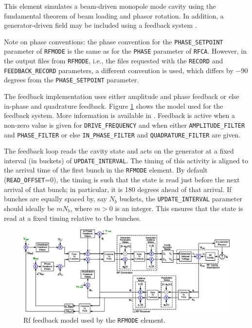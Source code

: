 This element simulates a beam-driven monopole mode cavity using the fundamental theorem of beam loading and phasor rotation.
In addition, a generator-driven field may be included using a feedback system \cite{Berenc-IPAC15-MOPMA006}.

Note on phase conventions: the phase convention for the \verb|PHASE_SETPOINT|  parameter of \verb|RFMODE| is the
same as for the \verb|PHASE| parameter of \verb|RFCA|. However, in the output files from \verb|RFMODE|, i.e., the
files requested with the \verb|RECORD| and \verb|FEEDBACK_RECORD| parameters, a different convention is used, which 
differs by $-90$ degrees from the \verb|PHASE_SETPOINT|  parameter. 

The feedback implementation uses either amplitude and phase feedback or else in-phase and quadrature feedback.
Figure \ref{fig:rfFeedbackModel} shows the model used for the feedback system.
More information is available in \cite{Berenc-IPAC15-MOPMA006}.
Feedback is active when a non-zero value is given for \verb|DRIVE_FREQUENCY| and when either
\verb|AMPLITUDE_FILTER| and \verb|PHASE_FILTER| or else
\verb|IN_PHASE_FILTER| and \verb|QUADRATURE_FILTER| are given.

The feedback loop reads the cavity state and acts on the generator at a fixed interval (in buckets) of
\verb|UPDATE_INTERVAL|. 
The timing of this activity is aligned to the arrival time of the first bunch in the \verb|RFMODE| element.
By default (\verb|READ_OFFSET|=0), the timing is such that the state is read just before the next arrival of
that bunch; in particular, it is 180 degrees ahead of that arrival.
If bunches are equally spaced by, say $N_b$ buckets, the \verb|UPDATE_INTERVAL| parameter should ideally be
$m N_b$, where $m>0$ is an integer.
This ensures that the state is read at a fixed timing relative to the bunches.

\begin{figure}[htb]
\center
\includegraphics{rfFeedbackModel}
\caption{Rf feedback model used by the {\tt RFMODE} element.}
\label{fig:rfFeedbackModel}
\end{figure}

